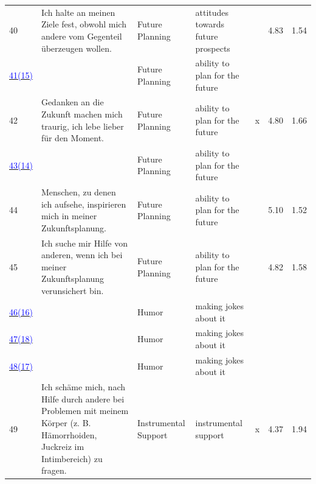 \documentclass[
  man,floatsintext]{apa7}
\begin{document}
\begin{center}
\begin{ThreePartTable}
{\begin{longtable}{m{0.6cm}m{7.3cm}m{2.2cm}m{2.2cm}m{0.2cm}m{0.4cm}m{0.4cm}}
40 & Ich halte an meinen Ziele fest, obwohl mich andere vom Gegenteil überzeugen wollen. & Future Planning & attitudes towards future prospects &  & 4.83 & 1.54\\
\label{zukun_2_344}\hyperref[table1]{\textcolor{blue}{41(15)}} & \cellcolor{lightgray}{Ich stelle aktiv die Weichen (z.B. Praktika, Sparmaßnahmen) für meine späteren Zukunftsziele.} & Future Planning & ability to plan for the future & \cellcolor{lightgray}{\ } & \cellcolor{lightgray}{4.74} & \cellcolor{lightgray}{1.69}\\
42 & Gedanken an die Zukunft machen mich traurig, ich lebe lieber für den Moment. & Future Planning & ability to plan for the future & x & 4.80 & 1.66\\
\label{zukun_2_347}\hyperref[table1]{\textcolor{blue}{43(14)}} & \cellcolor{lightgray}{Ich bin fest davon überzeugt, dass ich meine Pläne für die Zukunft umsetzen werde.} & Future Planning & ability to plan for the future & \cellcolor{lightgray}{\ } & \cellcolor{lightgray}{5.15} & \cellcolor{lightgray}{1.43}\\
44 & Menschen, zu denen ich aufsehe, inspirieren mich in meiner Zukunftsplanung. & Future Planning & ability to plan for the future &  & 5.10 & 1.52\\
45 & Ich suche mir Hilfe von anderen, wenn ich bei meiner Zukunftsplanung verunsichert bin. & Future Planning & ability to plan for the future &  & 4.82 & 1.58\\
\label{humor_1_082}\hyperref[table1]{\textcolor{blue}{46(16)}} & \cellcolor{lightgray}{Auch in einer schwierigen Lebensphase versuche ich, Dinge mit Humor zu nehmen.} & Humor & making jokes about it & \cellcolor{lightgray}{\ } & \cellcolor{lightgray}{5.29} & \cellcolor{lightgray}{1.51}\\
\label{humor_1_085_r}\hyperref[table1]{\textcolor{blue}{47(18)}} & \cellcolor{lightgray}{Ich verliere meinen Sinn für Humor, wenn ich mich in einer belastenden Situation befinde.} & Humor & making jokes about it & \cellcolor{lightgray}{x} & \cellcolor{lightgray}{4.56} & \cellcolor{lightgray}{1.77}\\
\label{humor_1_087}\hyperref[table1]{\textcolor{blue}{48(17)}} & \cellcolor{lightgray}{Wenn es angebracht ist, kann ich auch über ernste Themen lachen.} & Humor & making jokes about it & \cellcolor{lightgray}{\ } & \cellcolor{lightgray}{5.75} & \cellcolor{lightgray}{1.41}\\
49 & Ich schäme mich, nach Hilfe durch andere bei Problemen mit meinem Körper (z. B. Hämorrhoiden, Juckreiz im Intimbereich) zu fragen. & Instrumental Support & instrumental support & x & 4.37 & 1.94\\

\end{longtable}}
\end{ThreePartTable}
\end{center}
\end{document}
